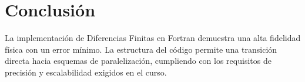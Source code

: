 \documentclass[12pt,a4paper]{article}
\begin{document}
\section{Conclusión}
La implementación de Diferencias Finitas en Fortran demuestra una alta fidelidad física con un error mínimo. La estructura del código permite una transición directa hacia esquemas de paralelización, cumpliendo con los requisitos de precisión y escalabilidad exigidos en el curso.
\end{document}
